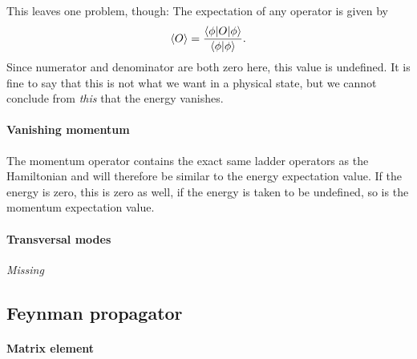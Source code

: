 \documentclass[11pt, english, fleqn, DIV=15, headinclude, BCOR=1cm]{scrartcl}
\begin{document}
This leaves one problem, though: The expectation of any operator is given by
\[
    \langle O \rangle = \frac{\braket{\phi | O | \phi}}{\braket{\phi | \phi}}.
\]
Since numerator and denominator are both zero here, this value is undefined. It
is fine to say that this is not what we want in a physical state, but we cannot
conclude from \emph{this} that the energy vanishes.

\paragraph{Vanishing momentum}

The momentum operator contains the exact same ladder operators as the
Hamiltonian and will therefore be similar to the energy expectation value. If
the energy is zero, this is zero as well, if the energy is taken to be
undefined, so is the momentum expectation value.

\paragraph{Transversal modes}

\emph{Missing}

\subsection{Feynman propagator}

\paragraph{Matrix element}
\end{document}
